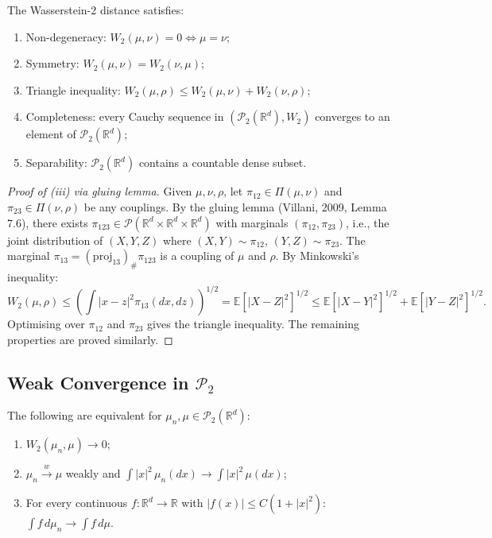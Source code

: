 \begin{theorem}
\label{thm:wasserstein-metric-space}
The Wasserstein-2 distance satisfies:
\begin{enumerate}[label=(\roman*)]
    \item Non-degeneracy: $W_2(\mu,\nu) = 0 \iff \mu = \nu$;
    \item Symmetry: $W_2(\mu,\nu) = W_2(\nu,\mu)$;
    \item Triangle inequality: $W_2(\mu,\rho) \leq W_2(\mu,\nu) + W_2(\nu,\rho)$;
    \item Completeness: every Cauchy sequence in $(\mathcal{P}_2(\mathbb{R}^d), W_2)$
    converges to an element of $\mathcal{P}_2(\mathbb{R}^d)$;
    \item Separability: $\mathcal{P}_2(\mathbb{R}^d)$ contains a countable dense subset.
\end{enumerate}
\end{theorem}

\begin{proof}[Proof of (iii) via gluing lemma]
Given $\mu, \nu, \rho$, let $\pi_{12} \in \Pi(\mu,\nu)$ and $\pi_{23} \in \Pi(\nu,\rho)$
be any couplings. By the gluing lemma (Villani, 2009, Lemma 7.6), there exists
$\pi_{123} \in \mathcal{P}(\mathbb{R}^d \times \mathbb{R}^d \times \mathbb{R}^d)$ with
marginals $(\pi_{12}, \pi_{23})$, i.e., the joint distribution of $(X,Y,Z)$ where
$(X,Y) \sim \pi_{12}$, $(Y,Z) \sim \pi_{23}$. The marginal
$\pi_{13} = (\mathrm{proj}_{13})_\# \pi_{123}$ is a coupling of $\mu$ and $\rho$. By
Minkowski's inequality:
\[
    W_2(\mu,\rho) \leq \left( \int |x-z|^2 \pi_{13}(dx,dz) \right)^{1/2} =
    \mathbb{E}[|X-Z|^2]^{1/2} \leq \mathbb{E}[|X-Y|^2]^{1/2} + \mathbb{E}[|Y-Z|^2]^{1/2}.
\]
Optimising over $\pi_{12}$ and $\pi_{23}$ gives the triangle inequality. The remaining
properties are proved similarly.
\end{proof}

\subsection{Weak Convergence in $\mathcal{P}_2$}

\begin{theorem}
\label{thm:w2-characterisation}
The following are equivalent for $\mu_n, \mu \in \mathcal{P}_2(\mathbb{R}^d)$:
\begin{enumerate}[label=(\roman*)]
    \item $W_2(\mu_n, \mu) \to 0$;
    \item $\mu_n \xrightarrow{w} \mu$ weakly and $\int |x|^2\, \mu_n(dx) \to
    \int |x|^2\, \mu(dx)$;
    \item For every continuous $f : \mathbb{R}^d \to \mathbb{R}$ with
    $|f(x)| \leq C(1+|x|^2)$: $\int f\, d\mu_n \to \int f\, d\mu$.
\end{enumerate}
\end{theorem}


